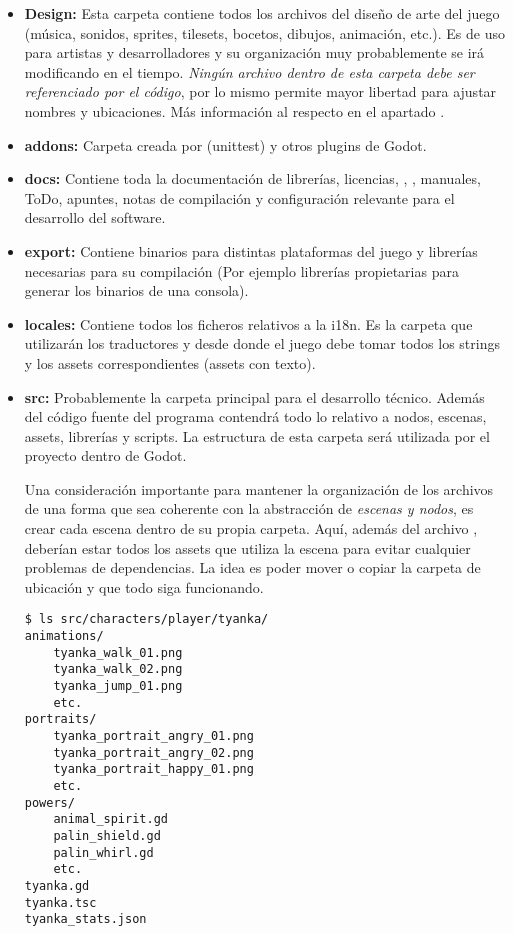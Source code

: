 \begin{itemize}
\item \textbf{Design:} Esta carpeta contiene todos los archivos del diseño de arte del juego (música, sonidos, sprites, tilesets, bocetos, dibujos, animación, etc.). Es de uso para artistas y desarrolladores y su organización muy probablemente se irá modificando en el tiempo. \emph{Ningún archivo dentro de esta carpeta debe ser referenciado por el código}, por lo mismo permite mayor libertad para ajustar nombres y ubicaciones. Más información al respecto en el apartado .

\item \textbf{addons:} Carpeta creada por  (unittest) y otros plugins de Godot.

\item \textbf{docs:} Contiene toda la documentación de librerías, licencias, , , manuales, ToDo, apuntes, notas de compilación y configuración relevante para el desarrollo del software.

\item \textbf{export:} Contiene binarios para distintas plataformas del juego y librerías necesarias para su compilación (Por ejemplo librerías propietarias para generar los binarios de una consola).

\item \textbf{locales:} Contiene todos los ficheros relativos a la i18n. Es la carpeta que utilizarán los traductores y desde donde el juego debe tomar todos los strings y los assets correspondientes (assets con texto).

\item \textbf{src:} Probablemente la carpeta principal para el desarrollo técnico. Además del código fuente del programa contendrá todo lo relativo a nodos, escenas, assets, librerías y scripts. La estructura de esta carpeta será utilizada por el proyecto dentro de Godot.

Una consideración importante para mantener la organización de los archivos de una forma que sea coherente con la abstracción de \textit{escenas y nodos}, es crear cada escena dentro de su propia carpeta. Aquí, además del archivo , deberían estar todos los assets que utiliza la escena para evitar cualquier problemas de dependencias. La idea es poder mover o copiar la carpeta de ubicación y que todo siga funcionando.

\begin{lstlisting}
$ ls src/characters/player/tyanka/
animations/
    tyanka_walk_01.png
    tyanka_walk_02.png
    tyanka_jump_01.png
    etc.
portraits/
    tyanka_portrait_angry_01.png
    tyanka_portrait_angry_02.png
    tyanka_portrait_happy_01.png
    etc.
powers/
    animal_spirit.gd
    palin_shield.gd
    palin_whirl.gd
    etc.
tyanka.gd
tyanka.tsc
tyanka_stats.json
\end{lstlisting}


\end{itemize}
